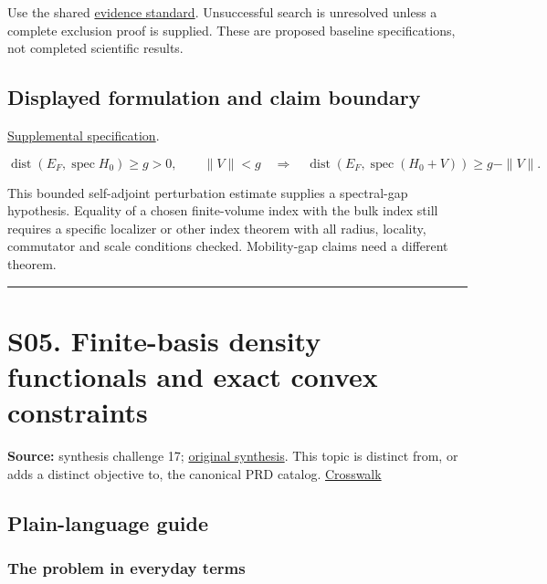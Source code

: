 \documentclass[
  11pt,
]{article}
\begin{document}
Use the shared
\href{https://github.com/rick-stevens-ai/Pure-Thought/blob/main/reviews/EVIDENCE-STANDARD.md}{evidence
standard}. Unsuccessful search is unresolved unless a complete exclusion
proof is supplied. These are proposed baseline specifications, not
completed scientific results.

\subsection{Displayed formulation and claim boundary}

\href{https://github.com/rick-stevens-ai/Pure-Thought/blob/main/supplemental/S04.md}{Supplemental
specification}.

\[\operatorname{dist}(E_F,\operatorname{spec}H_0)\ge g>0,
\qquad\|V\|<g\quad\Longrightarrow\quad
\operatorname{dist}(E_F,\operatorname{spec}(H_0+V))\ge g-\|V\|.\]

This bounded self-adjoint perturbation estimate supplies a spectral-gap
hypothesis. Equality of a chosen finite-volume index with the bulk index
still requires a specific localizer or other index theorem with all
radius, locality, commutator and scale conditions checked. Mobility-gap
claims need a different theorem.

\begin{center}\rule{0.5\linewidth}{0.5pt}\end{center}

\section{S05. Finite-basis density functionals and exact convex
constraints}

\textbf{Source:} synthesis challenge 17;
\href{https://github.com/rick-stevens-ai/Pure-Thought/blob/main/NOTES/30-Most-Compelling-Pure-Thought-AI-Challenges.md}{original
synthesis}. This topic is distinct from, or adds a distinct objective
to, the canonical PRD catalog.
\href{https://github.com/rick-stevens-ai/Pure-Thought/blob/main/reviews/SYNTHESIS-CROSSWALK.md}{Crosswalk}

\subsection{Plain-language guide}

\subsubsection{The problem in everyday terms}
\end{document}
